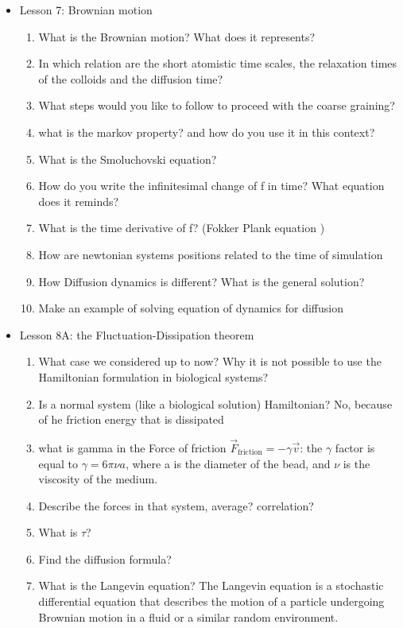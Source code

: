 {\begin{itemize}
\begin{enumerate}
    \end{enumerate}
    \item Lesson 7: Brownian motion
    \begin{enumerate}
    	\item What is the Brownian motion? What does it represents?
        \item In which relation are the short atomistic time scales, the relaxation times of the colloids and the diffusion time?
	\item What steps would you like to follow to proceed with the coarse graining?
	\item what is the markov property? and how do you use it in this context?
        \item What is the Smoluchovski equation?
        \item How do you write the infinitesimal change of f in time? What equation does it reminds?
        \item What is the time derivative of f? (Fokker Plank equation )
        \item How are newtonian systems positions related to the time of simulation
        \item How Diffusion dynamics is different? What is the general solution?
        \item Make an example of solving equation of dynamics for diffusion
    \end{enumerate}
    \item Lesson 8A: the Fluctuation-Dissipation theorem
    \begin{enumerate}
        \item What case we considered up to now? Why it is not possible to use the Hamiltonian formulation in biological systems?
        \item Is a normal system (like a biological solution) Hamiltonian? No, because of he friction energy that is dissipated
        \item what is gamma in the Force of friction $\vec{F}_{\text{friction}} = - \gamma \vec{v}$: the $\gamma$ factor is equal to $\gamma = 6 \pi \nu a$, where a is the diameter of the bead, and $\nu$ is the viscosity of the medium.
        \item Describe the forces in that system, average? correlation?
        \item What is $\tau$?
        \item Find the diffusion formula?
        \item What is the Langevin equation? The Langevin equation is a stochastic differential equation that describes the motion of a particle undergoing Brownian motion in a fluid or a similar random environment.

\end{enumerate}
\end{itemize}}
